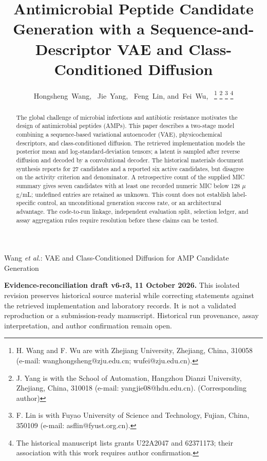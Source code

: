 \documentclass[journal]{IEEEtran}
\begin{document}

\title{Antimicrobial Peptide Candidate Generation with a Sequence-and-Descriptor VAE and Class-Conditioned Diffusion}

\author{Hongsheng~Wang,~
        Jie~Yang,~
        Feng~Lin,
        and~Fei~Wu,~
\thanks{H. Wang and F. Wu are with Zhejiang University, Zhejiang, China, 310058 (e-mail: wanghongsheng@zju.edu.cn; wufei@zju.edu.cn).}
\thanks{J. Yang is with the School of Automation, Hangzhou Dianzi University, Zhejiang, China, 310018 (e-mail: yangjie08@hdu.edu.cn). (Corresponding author)}
\thanks{F. Lin is with Fuyao University of Science and Technology, Fujian, China, 350109 (e-mail: asflin@fyust.org.cn).}
\thanks{The historical manuscript lists grants U22A2047 and 62371173; their association with this work requires author confirmation.}
}

\markboth{}%
{Wang \MakeLowercase{\textit{et al.}}: VAE and Class-Conditioned Diffusion for AMP Candidate Generation}

\maketitle
\noindent\textbf{Evidence-reconciliation draft v6-r3, 11 October 2026.}
This isolated revision preserves historical source material while correcting statements against the retrieved implementation and laboratory records. It is not a validated reproduction or a submission-ready manuscript. Historical run provenance, assay interpretation, and author confirmation remain open.

\begin{abstract}
The global challenge of microbial infections and antibiotic resistance motivates the design of antimicrobial peptides (AMPs). This paper describes a two-stage model combining a sequence-based variational autoencoder (VAE), physicochemical descriptors, and class-conditioned diffusion. The retrieved implementation models the posterior mean and log-standard-deviation tensors; a latent is sampled after reverse diffusion and decoded by a convolutional decoder. The historical materials document synthesis reports for 27 candidates and a reported six active candidates, but disagree on the activity criterion and denominator. A retrospective count of the supplied MIC summary gives seven candidates with at least one recorded numeric MIC below 128 $\mu$g/mL; undefined entries are retained as unknown. This count does not establish label-specific control, an unconditional generation success rate, or an architectural advantage. The code-to-run linkage, independent evaluation split, selection ledger, and assay aggregation rules require resolution before these claims can be tested.

\end{abstract}
\end{document}
